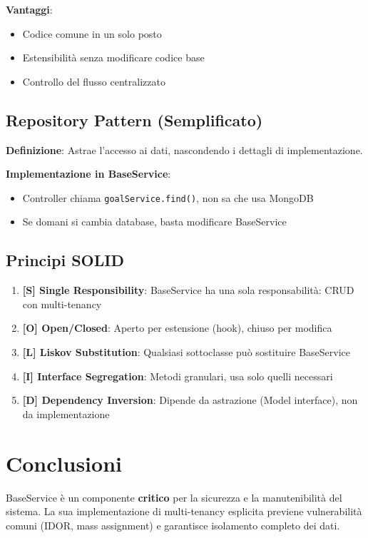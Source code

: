 \documentclass[11pt,a4paper]{article}
\begin{document}
\textbf{Vantaggi}:
\begin{itemize}
    \item Codice comune in un solo posto
    \item Estensibilità senza modificare codice base
    \item Controllo del flusso centralizzato
\end{itemize}

\subsection{Repository Pattern (Semplificato)}

\textbf{Definizione}: Astrae l'accesso ai dati, nascondendo i dettagli di implementazione.

\textbf{Implementazione in BaseService}:
\begin{itemize}
    \item Controller chiama \texttt{goalService.find()}, non sa che usa MongoDB
    \item Se domani si cambia database, basta modificare BaseService
\end{itemize}

\subsection{Principi SOLID}

\begin{enumerate}
    \item \textbf{[S] Single Responsibility}: BaseService ha una sola responsabilità: CRUD con multi-tenancy
    \item \textbf{[O] Open/Closed}: Aperto per estensione (hook), chiuso per modifica
    \item \textbf{[L] Liskov Substitution}: Qualsiasi sottoclasse può sostituire BaseService
    \item \textbf{[I] Interface Segregation}: Metodi granulari, usa solo quelli necessari
    \item \textbf{[D] Dependency Inversion}: Dipende da astrazione (Model interface), non da implementazione
\end{enumerate}

\section{Conclusioni}

BaseService è un componente \textbf{critico} per la sicurezza e la manutenibilità del sistema. La sua implementazione di multi-tenancy esplicita previene vulnerabilità comuni (IDOR, mass assignment) e garantisce isolamento completo dei dati.
\end{document}

